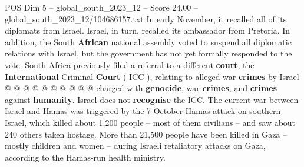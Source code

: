 \begin{textsample}{POS Dim 5 – global\_south\_2023\_12 – Score 24.00 – global\_south\_2023\_12/104686157.txt}
In early November, it recalled all of its diplomats from Israel.
Israel, in turn, recalled its ambassador from Pretoria.
In addition, the South \textbf{African} national assembly voted to suspend all diplomatic relations with Israel, but the government has not yet formally responded to the vote.
South Africa previously filed a referral to a different \textbf{court}, the \textbf{International} Criminal \textbf{Court} ( ICC ), relating to alleged war \textbf{crimes} by Israel @ @ @ @ @ @ @ @ @ @ charged with \textbf{genocide}, war \textbf{crimes}, and \textbf{crimes} against \textbf{humanity}.
Israel does not \textbf{recognise} the ICC.
The current war between Israel and Hamas was triggered by the 7 October Hamas attack on southern Israel, which killed about 1,200 people -- most of them civilians -- and saw about 240 others taken hostage.
More than 21,500 people have been killed in Gaza -- mostly children and women -- during Israeli retaliatory attacks on Gaza, according to the Hamas-run health ministry.

\end{textsample}
